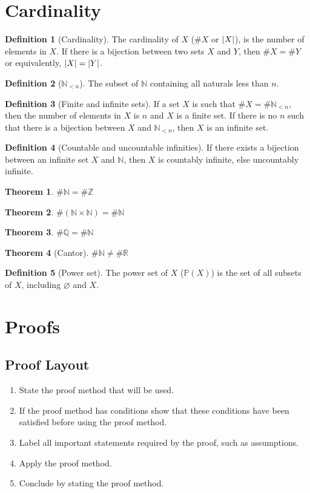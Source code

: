 \documentclass{article}
\let\emptyset\varnothing
\theoremstyle{plain}
\newtheorem{theorem}{Theorem}[section]
\numberwithin{theorem}{section}
\theoremstyle{definition}
\newtheorem{definition}{Definition}[section]
\numberwithin{definition}{section}
\theoremstyle{remark}
\numberwithin{note}{section}
\newcommand*{\N}{\mathbb{N}}
\newcommand*{\Z}{\mathbb{Z}}
\newcommand*{\Q}{\mathbb{Q}}
\newcommand*{\R}{\mathbb{R}}
\begin{document}
\section{Cardinality}
\begin{definition}[Cardinality]
    The cardinality of $X$ ($\#X$ or $\abs{X}$), is the number of elements in $X$.
    If there is a bijection between two sets $X$ and $Y$,
    then $\#X=\#Y$ or equivalently, $\abs{X} = \abs{Y}$.
\end{definition}
%
\begin{definition}[$\N_{<n}$]
    The subset of $\N$ containing all naturals less than $n$.
\end{definition}
%
\begin{definition}[Finite and infinite sets]
    If a set $X$ is such that $\#X=\#\N_{<n}$,
    then the number of elements in $X$ is $n$ and $X$ is a finite set.
    If there is no $n$ such that there is a bijection between $X$ and $\N_{<n}$,
    then $X$ is an infinite set.
\end{definition}
%
\begin{definition}[Countable and uncountable infinities]
    If there exists a bijection between an infinite set $X$ and $\N$,
    then $X$ is countably infinite, else uncountably infinite.
\end{definition}
%
\begin{theorem}$\#\N = \#\Z$\end{theorem}
\begin{theorem}$\#(\N\times\N) = \#\N$\end{theorem}
\begin{theorem}$\#\Q = \#\N$\end{theorem}
\begin{theorem}[Cantor]$\#\N \ne \#\R$\end{theorem}
%
\begin{definition}[Power set]
    The power set of $X$ ($\mathbb{P}(X)$) is the set of all subsets of $X$,
    including $\emptyset$ and $X$.
\end{definition}
%
\section{Proofs}
\subsection{Proof Layout}
\begin{enumerate}
    \item State the proof method that will be used.
    \item If the proof method has conditions show that these conditions have been satisfied before using the proof method.
    \item Label all important statements required by the proof, such as assumptions.
    \item Apply the proof method.
    \item Conclude by stating the proof method.
\end{enumerate}
%
\end{document}
